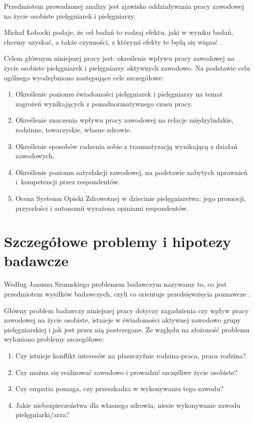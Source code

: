 \documentclass[a4paper,12pt,twoside,openright]{mwrep}
\begin{document}
Przedmiotem prowadzonej analizy jest zjawisko oddziaływania pracy zawodowej na życie osobiste pielęgniarek i pielęgniarzy.

Michał Łobocki podaje, że cel badań to rodzaj efektu, jaki w wyniku badań, chcemy uzyskać, a także czynności, z którymi efekty te będą się wiązać \cite{mich}.

Celem głównym niniejszej pracy jest: określenie wpływu pracy zawodowej na życie osobiste pielęgniarek i pielęgniarzy aktywnych zawodowo.
Na podstawie celu ogólnego wyodrębniono następujące cele szczegółowe:
\begin{enumerate}
	\item Określenie poziomu świadomości pielęgniarek i pielęgniarzy na temat zagrożeń wynikających z ponadnormatywnego czasu pracy.
	\item Określenie znaczenia wpływu pracy zawodowej na relacje międzyludzkie, rodzinne, towarzyskie, własne zdrowie.
	\item Określenie sposobów radzenia sobie z traumatyzacją wynikającą z działań zawodowych.
	\item Określenie poziomu satysfakcji zawodowej, na podstawie nabytych uprawnień i~kompetencji przez respondentów.
	\item Ocena Systemu Opieki Zdrowotnej w dziecinie pielęgniarstwa: jego promocji, przyszłości i autonomii wyrażona opiniami respondentów.
\end{enumerate}

\section{Szczegółowe problemy i hipotezy badawcze}
Według Janusza Szumskiego problemem badawczym nazywamy to, co jest przedmiotem wysiłków badawczych, czyli co orientuje przedsięwzięcia poznawcze \cite{janusz}.

Główny problem badawczy niniejszej pracy dotyczy zagadnienia czy wpływ pracy zawodowej na życie osobiste, istnieje w świadomości aktywnej zawodowo grupy pielęgniarskiej i jak jest przez nią postrzegane. Ze względu na złożoność problemu wyłoniono problemy szczegółowe:
\begin{enumerate}
	\item Czy istnieje konflikt interesów na płaszczyźnie rodzina-praca, praca rodzina?
	\item Czy można się realizować zawodowo i prowadzić szczęśliwe życie osobiste?
	\item Czy empatia pomaga, czy przeszkadza w wykonywaniu tego zawodu?
	\item Jakie niebezpieczeństwa dla własnego zdrowia, niesie wykonywanie zawodu pielęgniarki/arza?
\end{enumerate}
\end{document}
